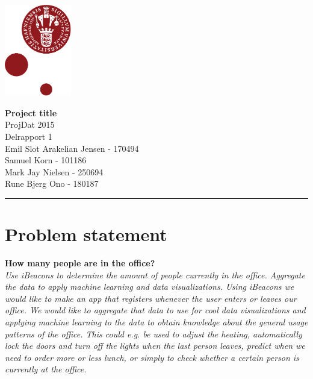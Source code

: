 \documentclass[12pt]{article}
\begin{document}
\begin{minipage}[b]{1.0\linewidth} 
\includegraphics[height=40mm]{KULogo}

\vspace*{-30ex}
\begin{center}
    {\Large \bf Project title} \vspace*{1ex} \\
    {\large ProjDat 2015} \vspace*{1ex} \\
    {\large Delrapport 1} \vspace*{1ex} \\
    {\large Emil Slot Arakelian Jensen - 170494} \vspace*{1ex}\\
    {\large Samuel Korn - 101186} \vspace*{1ex}\\
    {\large Mark Jay Nielsen - 250694} \vspace*{1ex}\\
    {\large Rune Bjerg Ono - 180187} \vspace*{1ex}\\
\end{center}

\vspace*{-3pt}
{\color{KU-red}\hrule}
\end{minipage}










\newpage

\tableofcontents










\newpage
\section{Problem statement}
\textbf{How many people are in the office?}\\
\textit{Use iBeacons to determine the amount of people currently in the office. Aggregate the data to apply machine learning and data visualizations.
Using iBeacons we would like to make an app that registers whenever the user enters or leaves our office. We would like to aggregate that data to use for cool data visualizations and applying machine learning to the data to obtain knowledge about the general usage patterns of the office. This could e.g. be used to adjust the heating, automatically lock the doors and turn off the lights when the last person leaves, predict when we need to order more or less lunch, or simply to check whether a certain person is currently at the office.} \cite{website}\\
\end{document}
